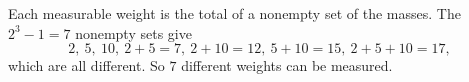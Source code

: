 Each measurable weight is the total of a nonempty set of the masses. The $2^3-1=7$ nonempty sets give
\[
2,\ 5,\ 10,\ 2+5=7,\ 2+10=12,\ 5+10=15,\ 2+5+10=17,
\]
which are all different. So $\boxed{7}$ different weights can be measured.
